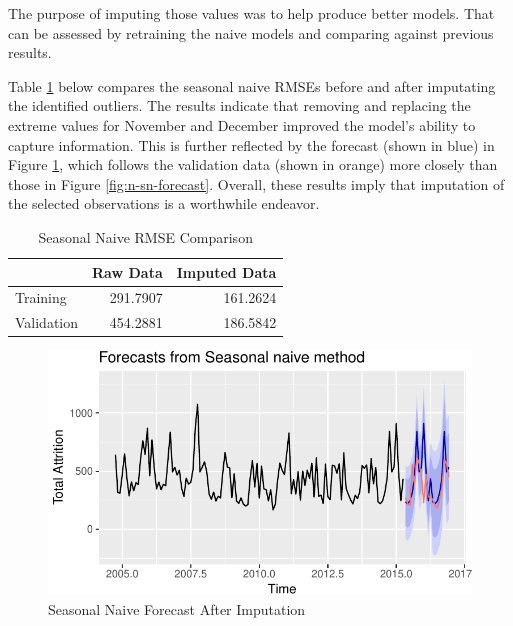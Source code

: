 \documentclass[12pt,letterpaper,toc=flat,oneside]{report}
\theoremstyle{definition}
\theoremstyle{definition}
\theoremstyle{definition}
\theoremstyle{remark}
\begin{document}
The purpose of imputing those values was to help produce better models.
That can be assessed by retraining the naive models and comparing
against previous results.

Table \ref{tab:season-rmse-compare} below compares the seasonal naive
RMSEs before and after imputating the identified outliers. The results
indicate that removing and replacing the extreme values for November and
December improved the model's ability to capture information. This is
further reflected by the forecast (shown in blue) in Figure
\ref{fig:sn-forecast-2}, which follows the validation data (shown in
orange) more closely than those in Figure \ref{fig:n-sn-forecast}.
Overall, these results imply that imputation of the selected
observations is a worthwhile endeavor.

\begin{table}

\caption{\label{tab:season-rmse-compare}Seasonal Naive RMSE Comparison}
\centering
\begin{tabular}[t]{l|r|r}
\hline
  & Raw Data & Imputed Data\\
\hline
Training & 291.7907 & 161.2624\\
\hline
Validation & 454.2881 & 186.5842\\
\hline
\end{tabular}
\end{table}

\begin{figure}[H]

{\centering \includegraphics{elliott-econometric-personnel-retention-18_files/figure-latex/sn-forecast-2-1} 

}

\caption{Seasonal Naive Forecast After Imputation}\label{fig:sn-forecast-2}
\end{figure}
\end{document}

